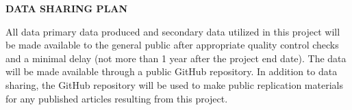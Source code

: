 \documentclass[12pt]{elsarticle}
\begin{document}
\begin{center} \textbf{DATA SHARING PLAN} \end{center}

All data primary data produced and secondary data utilized in this project will be made available to the general public after appropriate quality control checks and a minimal delay (not more than 1 year after the project end date). The data will be made available through a public GitHub repository. In addition to data sharing, the GitHub repository will be used to make public replication materials for any published articles resulting from this project.
\end{document}
